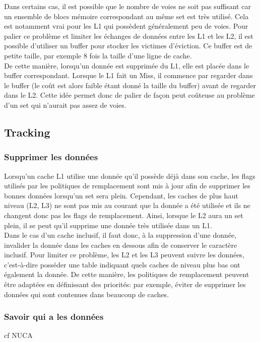 \documentclass[a4paper]{article}
\begin{document}
\indent Dans certains cas, il est possible que le nombre de voies ne soit pas suffisant car un ensemble de blocs mémoire correspondant au même set est très utilisé. Cela est notamment vrai pour les L1 qui possèdent généralement peu de voies. Pour palier ce problème et limiter les échanges de données entre les L1 et les L2, il est possible d'utiliser un buffer pour stocker les victimes d'éviction. Ce buffer est de petite taille, par exemple $8$ fois la taille d'une ligne de cache. \\

\indent De cette manière, lorsqu'un donnée est supprimée du L1, elle est placée dans le buffer correspondant. Lorsque le L1 fait un Miss, il commence par regarder dans le buffer (le coût est alors faible étant donné la taille du buffer) avant de regarder dans le L2. Cette idée permet donc de palier de façon peut coûteuse au problème d'un set qui n'aurait pas assez de voies.

\subsection{Tracking}
\subsubsection{Supprimer les données}
\indent Lorsqu'un cache L1 utilise une donnée qu'il possède déjà dans son cache, les flags utilisés par les politiques de remplacement sont mis à jour afin de supprimer les bonnes données lorsqu'un set sera plein. Cependant, les caches de plus haut niveau (L2, L3) ne sont pas mis au courant que la donnée a été utilisée et ils ne changent donc pas les flags de remplacement. Ainsi, lorsque le L2 aura un set plein, il se peut qu'il supprime une donnée très utilisée dans un L1. \\

\indent Dans le cas d'un cache inclusif, il faut donc, à la suppression d'une donnée, invalider la donnée dans les caches en dessous afin de conserver le caractère inclusif. Pour limiter ce problème, les L2 et les L3 peuvent suivre les données, c'est-à-dire posséder une table indiquant quels caches de niveau plus bas ont également la donnée. De cette manière, les politiques de remplacement peuvent être adaptées en définissant des priorités: par exemple, éviter de supprimer les données qui sont contenues dans beaucoup de caches.

\subsubsection{Savoir qui a les données}
\indent cf NUCA
\end{document}
